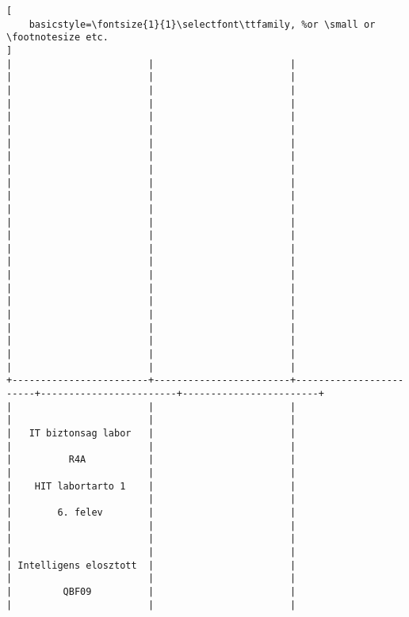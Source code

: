 \begin{lstlisting}[
    basicstyle=\fontsize{1}{1}\selectfont\ttfamily, %or \small or \footnotesize etc.
]
|                        |                        |                        |                        |                        | 
|                        |                        |                        |                        |                        | 
|                        |                        |                        |                        |                        | 
|                        |                        |                        |                        |                        | 
|                        |                        |                        |                        |                        | 
|                        |                        |                        |                        |                        | 
|                        |                        |                        |                        |                        | 
|                        |                        |                        |                        |                        | 
|                        |                        |                        |                        |                        | 
|                        |                        |                        |                        |                        | 
|                        |                        |                        |                        |                        | 
|                        |                        |                        |                        |                        | 
+------------------------+------------------------+------------------------+------------------------+------------------------+
|                        |                        |                        |                        |                        | 
|   IT biztonsag labor   |                        |                        |                        |                        | 
|          R4A           |                        |                        |                        |                        | 
|    HIT labortarto 1    |                        |                        |                        |                        | 
|        6. felev        |                        |                        |                        |                        | 
|                        |                        |                        |                        |                        | 
| Intelligens elosztott  |                        |                        |                        |                        | 
|         QBF09          |                        |                        |                        |                        | 

\end{lstlisting}
